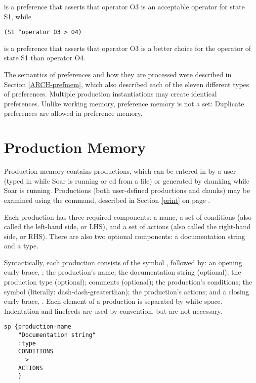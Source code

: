 is a preference that asserts that operator O3 is an acceptable operator for state S1, while

\begin{verbatim}
(S1 ^operator O3 > O4)
\end{verbatim}

is a preference that asserts that operator O3 is a better choice for the operator of state S1 than operator O4.

The semantics of preferences and how they are processed were described in Section \ref{ARCH-prefmem}, which also described each of the eleven different types of preferences.  Multiple production instantiations may create identical preferences. Unlike working memory, preference memory is not a set: Duplicate preferences are allowed in preference memory.


\section{Production Memory}
\label{SYNTAX-pm}

Production memory contains productions, which can be entered in by a user (typed in while Soar is running or ed from a file) or generated by chunking while Soar is running. Productions (both user-defined productions and chunks) may be examined using the  command, described in Section \ref{print} on page \pageref{print}.

Each production has three required components: a name, a set of conditions (also called the left-hand side, or LHS), and a set of actions (also called the right-hand side, or RHS).  There are also two optional components: a documentation string and a type.

Syntactically, each production consists of the symbol , followed by: an opening curly brace, \soar{\{}; the production's name; the documentation string (optional); the production type (optional); comments (optional); the production's conditions; the symbol \soar{-->} (literally: dash-dash-greaterthan); the production's actions; and a closing curly brace, \soar{\}}.  Each element of a production is separated by white space. Indentation and linefeeds are used by convention, but are not necessary.

\begin{verbatim}
sp {production-name
    "Documentation string"
    :type
    CONDITIONS
    -->
    ACTIONS
    }
\end{verbatim}
\vspace{12pt}

